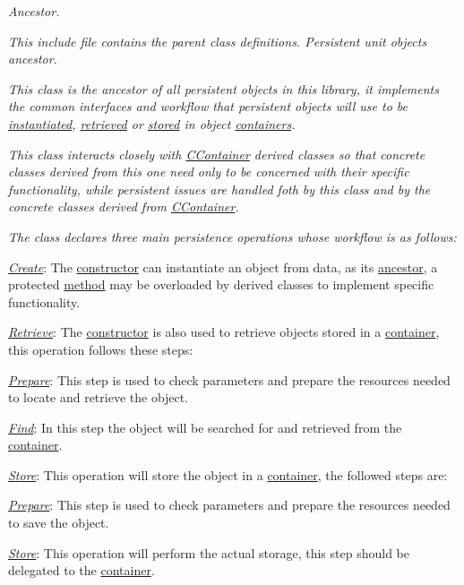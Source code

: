 {\itshape Ancestor.}

{\itshape This include file contains the parent class definitions. Persistent unit objects ancestor.}

{\itshape This class is the ancestor of all persistent objects in this library, it implements the common interfaces and workflow that persistent objects will use to be \hyperlink{}{instantiated}, \hyperlink{}{retrieved} or \hyperlink{}{stored} in object \hyperlink{class_c_container}{containers}.}

{\itshape This class interacts closely with \hyperlink{class_c_container}{C\-Container} derived classes so that concrete classes derived from this one need only to be concerned with their specific functionality, while persistent issues are handled foth by this class and by the concrete classes derived from \hyperlink{class_c_container}{C\-Container}.}

{\itshape The class declares three main persistence operations whose workflow is as follows\-:}

{\itshape 
\begin{DoxyItemize}
\item {\itshape \hyperlink{}{Create}}\-: The \hyperlink{}{constructor} can instantiate an object from data, as its \hyperlink{class_c_array_object}{ancestor}, a protected \hyperlink{}{method} may be overloaded by derived classes to implement specific functionality. 
\item {\itshape \hyperlink{}{Retrieve}}\-: The \hyperlink{}{constructor} is also used to retrieve objects stored in a \hyperlink{class_c_container}{container}, this operation follows these steps\-: 
\begin{DoxyItemize}
\item {\itshape \hyperlink{}{Prepare}}\-: This step is used to check parameters and prepare the resources needed to locate and retrieve the object. 
\item {\itshape \hyperlink{}{Find}}\-: In this step the object will be searched for and retrieved from the \hyperlink{class_c_container}{container}. 
\end{DoxyItemize}
\item {\itshape \hyperlink{}{Store}}\-: This operation will store the object in a \hyperlink{class_c_container}{container}, the followed steps are\-: 
\begin{DoxyItemize}
\item {\itshape \hyperlink{}{Prepare}}\-: This step is used to check parameters and prepare the resources needed to save the object. 
\item {\itshape \hyperlink{}{Store}}\-: This operation will perform the actual storage, this step should be delegated to the \hyperlink{class_c_container}{container}. 
\end{DoxyItemize}
\end{DoxyItemize}}

